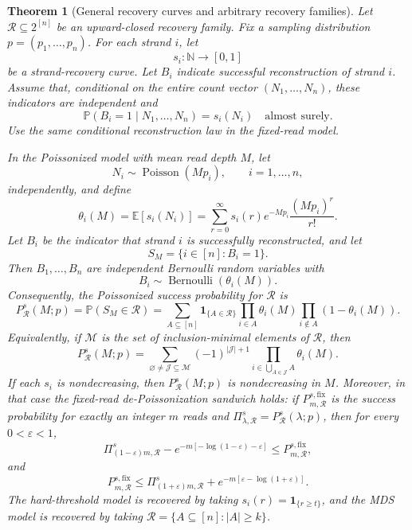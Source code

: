 \documentclass[11pt]{article}
\newtheorem{theorem}{Theorem}
\theoremstyle{definition}
\theoremstyle{remark}
\DeclareMathOperator{\Poisson}{Poisson}
\DeclareMathOperator{\Bernoulli}{Bernoulli}
\newcommand{\E}{\mathbb E}
\newcommand{\Pbb}{\mathbb P}
\newcommand{\N}{\mathbb N}
\newcommand{\1}{\mathbf 1}
\begin{document}
\begin{theorem}[General recovery curves and arbitrary recovery families]\label{thm:general-recovery-curves}
Let \(\mathcal R\subseteq 2^{[n]}\) be an upward-closed recovery family.  Fix a sampling distribution \(p=(p_1,\ldots,p_n)\).  For each strand \(i\), let
\[
  s_i:\N\to[0,1]
\]
be a strand-recovery curve. Let \(B_i\) indicate successful reconstruction of strand \(i\). Assume that, conditional on the entire count vector \((N_1,\ldots,N_n)\), these indicators are independent and
\[
 \Pbb(B_i=1\mid N_1,\ldots,N_n)=s_i(N_i)
 \quad\text{almost surely}.
\]
Use the same conditional reconstruction law in the fixed-read model.

In the Poissonized model with mean read depth \(M\), let
\[
  N_i\sim\Poisson(Mp_i),\qquad i=1,\ldots,n,
\]
independently, and define
\[
  \theta_i(M)=\E[s_i(N_i)]
  =\sum_{r=0}^{\infty}s_i(r)e^{-Mp_i}\frac{(Mp_i)^r}{r!}.
\]
Let \(B_i\) be the indicator that strand \(i\) is successfully reconstructed, and let
\[
  S_M=\{i\in[n]:B_i=1\}.
\]
Then \(B_1,\ldots,B_n\) are independent Bernoulli random variables with
\[
  B_i\sim\Bernoulli(\theta_i(M)).
\]
Consequently, the Poissonized success probability for \(\mathcal R\) is
\[
  P_{\mathcal R}^{s}(M;p)
  =\Pbb(S_M\in\mathcal R)
  =\sum_{A\subseteq[n]}\1_{\{A\in\mathcal R\}}
    \prod_{i\in A}\theta_i(M)
    \prod_{i\notin A}(1-\theta_i(M)).
\]
Equivalently, if \(\mathcal M\) is the set of inclusion-minimal elements of \(\mathcal R\), then
\[
  P_{\mathcal R}^{s}(M;p)
  =\sum_{\varnothing\ne\mathcal J\subseteq\mathcal M}
    (-1)^{|\mathcal J|+1}
    \prod_{i\in\bigcup_{A\in\mathcal J}A}\theta_i(M).
\]
If each \(s_i\) is nondecreasing, then \(P_{\mathcal R}^{s}(M;p)\) is nondecreasing in \(M\).  Moreover, in that case the fixed-read de-Poissonization sandwich holds: if \(P_{m,\mathcal R}^{s,\mathrm{fix}}\) is the success probability for exactly an integer \(m\) reads and \(\Pi_{\lambda,\mathcal R}^{s}=P_{\mathcal R}^{s}(\lambda;p)\), then for every \(0<\varepsilon<1\),
\[
  \Pi_{(1-\varepsilon)m,\mathcal R}^{s}
  -e^{-m[-\log(1-\varepsilon)-\varepsilon]}
  \le
  P_{m,\mathcal R}^{s,\mathrm{fix}},
\]
and
\[
  P_{m,\mathcal R}^{s,\mathrm{fix}}
  \le
  \Pi_{(1+\varepsilon)m,\mathcal R}^{s}
  +e^{-m[\varepsilon-\log(1+\varepsilon)]}.
\]
The hard-threshold model is recovered by taking \(s_i(r)=\1_{\{r\ge t\}}\), and the MDS model is recovered by taking \(\mathcal R=\{A\subseteq[n]: |A|\ge k\}\).
\end{theorem}
\end{document}
